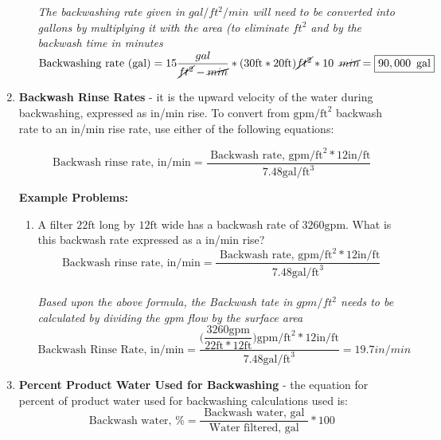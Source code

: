 \begin{enumerate}
\begin{enumerate}[1.]
\textit{The backwashing rate given in $gal/ft^2/min$ will need to be converted into gallons by multiplying it with the area (to eliminate $ft^2$ and by the backwash time in minutes}\\

$ \text{Backwashing rate (gal)} = 15\dfrac{gal}{\cancel{ft^2}-\cancel{min}}*(30 \mathrm{ ft} * 20 \mathrm{ ft})\cancel{ft^2}*10 \enspace \cancel{min}=\boxed{90,000 \enspace \text{gal}}$\\
\end{enumerate}

\item \textbf{Backwash Rinse Rates} - it is the upward velocity of the water during backwashing, expressed as in/min rise. To convert from $\mathrm{gpm} / \mathrm{ft}^{2}$ backwash rate to an in/min rise rate, use either of the following equations:

$$\text{ Backwash rinse rate, in/} \mathrm{min}=\frac{\text { Backwash rate, } \mathrm{gpm} / \mathrm{ft}^{2} * 12 \mathrm{in} / \mathrm{ft}}{7.48 \mathrm{gal} / \mathrm{ft}^{3}}$$

\textbf{Example Problems:}\\
\begin{enumerate}[1.]
\item A filter $22 \mathrm{ft}$ long by $12 \mathrm{ft}$ wide has a backwash rate of $3260 \mathrm{gpm}$. What is this backwash rate expressed as a in/min rise?\\
\vspace{0.2cm}
$$\text{ Backwash rinse rate, in/} \mathrm{min}=\frac{\text { Backwash rate, } \mathrm{gpm} / \mathrm{ft}^{2} * 12 \mathrm{in} / \mathrm{ft}}{7.48 \mathrm{gal} / \mathrm{ft}^{3}}$$\\
\vspace{0.2cm}
\textit{Based upon the above formula, the Backwash tate in $gpm/ft^2$ needs to be calculated by dividing the gpm flow by the surface area}\\
\vspace{0.2cm}
$\text{Backwash Rinse Rate, in/} \mathrm{min}=\dfrac{
\Biggl(\dfrac{3260 \mathrm{gpm}}{22 \mathrm{ft} * 12 \mathrm{ft}}\Biggr) \mathrm{gpm} / \mathrm{ft}^{2} * 12 \mathrm{in} / \mathrm{ft}
}
{
7.48 \mathrm{gal} / \mathrm{ft}^{3}
}=\boxed{19.7in/min}$\\
\end{enumerate}

\item \textbf{Percent Product Water Used for Backwashing} - the equation for percent of product water used for backwashing calculations used is:\\
$$
\text { Backwash water, } \%=\frac{\text { Backwash water, gal }}{\text { Water filtered, gal }} * 100
$$


\end{enumerate}

